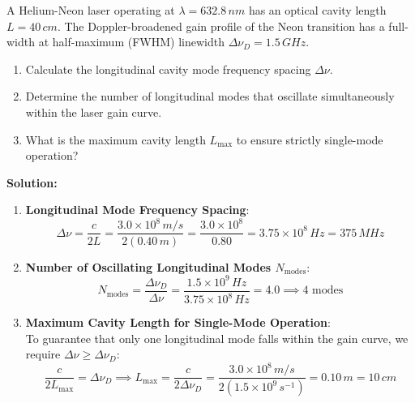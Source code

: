 \begin{example}
A Helium-Neon laser operating at $\lambda = 632.8\,\si{nm}$ has an optical cavity length $L = 40\,\si{cm}$. The Doppler-broadened gain profile of the Neon transition has a full-width at half-maximum (FWHM) linewidth $\Delta \nu_D = 1.5\,\si{GHz}$.
\begin{enumerate}
    \item Calculate the longitudinal cavity mode frequency spacing $\Delta \nu$.
    \item Determine the number of longitudinal modes that oscillate simultaneously within the laser gain curve.
    \item What is the maximum cavity length $L_{\text{max}}$ to ensure strictly single-mode operation?
\end{enumerate}

\textbf{Solution:}
\begin{enumerate}
    \item \textbf{Longitudinal Mode Frequency Spacing}:
    \begin{equation*}
        \Delta \nu = \frac{c}{2L} = \frac{3.0 \times 10^8\,\si{m/s}}{2(0.40\,\si{m})} = \frac{3.0 \times 10^8}{0.80} = 3.75 \times 10^8\,\si{Hz} = 375\,\si{MHz}
    \end{equation*}
    
    \item \textbf{Number of Oscillating Longitudinal Modes $N_{\text{modes}}$}:
    \begin{equation*}
        N_{\text{modes}} = \frac{\Delta \nu_D}{\Delta \nu} = \frac{1.5 \times 10^9\,\si{Hz}}{3.75 \times 10^8\,\si{Hz}} = 4.0 \implies 4 \text{ modes}
    \end{equation*}
    
    \item \textbf{Maximum Cavity Length for Single-Mode Operation}:\\
    To guarantee that only one longitudinal mode falls within the gain curve, we require $\Delta \nu \ge \Delta \nu_D$:
    \begin{equation*}
        \frac{c}{2 L_{\text{max}}} = \Delta \nu_D \implies L_{\text{max}} = \frac{c}{2\Delta \nu_D} = \frac{3.0 \times 10^8\,\si{m/s}}{2(1.5 \times 10^9\,\si{s^{-1}})} = 0.10\,\si{m} = 10\,\si{cm}
    \end{equation*}
\end{enumerate}
\end{example}

